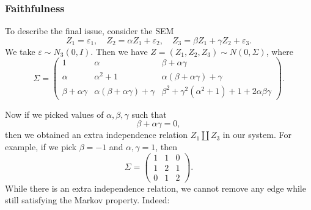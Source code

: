 \documentclass[a4paper]{article}
\begin{document}
\subsubsection*{Faithfulness}
To describe the final issue, consider the SEM
\[
  Z_1 = \varepsilon_1,\quad Z_2 = \alpha Z_1 + \varepsilon_2,\quad Z_3 = \beta Z_1 + \gamma Z_2 + \varepsilon_3.
\]
We take $\varepsilon \sim N_3(0, I)$. Then we have $Z = (Z_1, Z_2, Z_3) \sim N(0, \Sigma)$, where
\[
  \Sigma =
  \begin{pmatrix}
    1 & \alpha & \beta + \alpha \gamma\\
    \alpha & \alpha^2 + 1 & \alpha(\beta + \alpha \gamma) + \gamma\\
    \beta + \alpha\gamma & \alpha(\beta + \alpha \gamma) + \gamma & \beta^2 + \gamma^2(\alpha^2 + 1) + 1 + 2\alpha \beta \gamma
  \end{pmatrix}.
\]
\begin{center}
\end{center}
Now if we picked values of $\alpha, \beta, \gamma$ such that
\[
  \beta + \alpha \gamma = 0,
\]
then we obtained an extra independence relation $Z_1 \amalg Z_3$ in our system. For example, if we pick $\beta = -1$ and $\alpha, \gamma = 1$, then
\[
  \Sigma =
  \begin{pmatrix}
    1 & 1 & 0\\
    1 & 2 & 1\\
    0 & 1 & 2
  \end{pmatrix}.
\]
While there is an extra independence relation, we cannot remove any edge while still satisfying the Markov property. Indeed:
\end{document}
